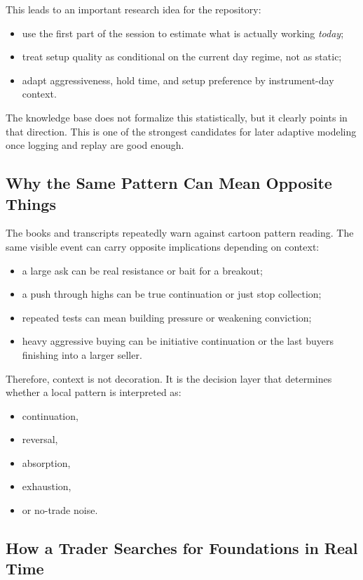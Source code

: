 This leads to an important research idea for the repository:
\begin{itemize}
  \item use the first part of the session to estimate what is actually working \emph{today};
  \item treat setup quality as conditional on the current day regime, not as static;
  \item adapt aggressiveness, hold time, and setup preference by instrument-day context.
\end{itemize}

The knowledge base does not formalize this statistically, but it clearly points in that direction.
This is one of the strongest candidates for later adaptive modeling once logging and replay are good enough.

\subsection{Why the Same Pattern Can Mean Opposite Things}

The books and transcripts repeatedly warn against cartoon pattern reading.
The same visible event can carry opposite implications depending on context:
\begin{itemize}
  \item a large ask can be real resistance or bait for a breakout;
  \item a push through highs can be true continuation or just stop collection;
  \item repeated tests can mean building pressure or weakening conviction;
  \item heavy aggressive buying can be initiative continuation or the last buyers finishing into a larger seller.
\end{itemize}

Therefore, context is not decoration.
It is the decision layer that determines whether a local pattern is interpreted as:
\begin{itemize}
  \item continuation,
  \item reversal,
  \item absorption,
  \item exhaustion,
  \item or no-trade noise.
\end{itemize}

\subsection{How a Trader Searches for Foundations in Real Time}

